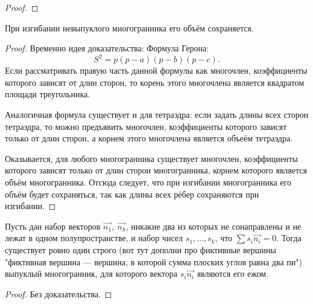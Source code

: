 \begin{proof}

    
\end{proof}


\begin{theorem}[Сабитов]
    При изгибании невыпуклого многогранника его объём сохраняется.
\end{theorem}
\begin{proof}
    Временно идея доказательства: Формула Герона:
    \[S^2 = p(p - a)(p - b)(p - c).\]
    Если рассматривать правую часть данной формулы как многочлен, коэффициенты которого зависят от длин сторон, то корень этого многочлена является квадратом площади треугольника.

    Аналогичная формула существует и для тетраэдра: если задать длины всех сторон тетраэдра, то можно предъявить многочлен, коэффициенты которого зависят только от длин сторон, а корнем этого многочлена является объеём тетраэдра.

    Оказывается, для любого многогранника существует многочлен, коэффициенты которого зависят только от длин сторон многогранника, корнем которого является объём многогранника. Отсюда следует, что при изгибании многогранника его объём будет сохраняться, так как длины всех рёбер сохраняются при изгибании.
\end{proof}

\begin{theorem}[Минковский]
    Пусть дан набор векторов $\overrightarrow{n_1}, \ \overrightarrow{n_k}$, никакие два из которых не сонаправлены и не лежат в одном полупространстве, и набор чисел $s_1, \dots, s_k$, что $\sum s_i \overrightarrow{n_i} = 0$. Тогда существует ровно один строго (вот тут дополни про фиктивные вершины "фиктивная вершина — вершина, в которой сумма плоских углов равна два пи") выпуклый многогранник, для которого вектора $s_i \overrightarrow{n_i}$ являются его ежом.
\end{theorem}
\begin{proof}
    Без доказательства.
\end{proof}